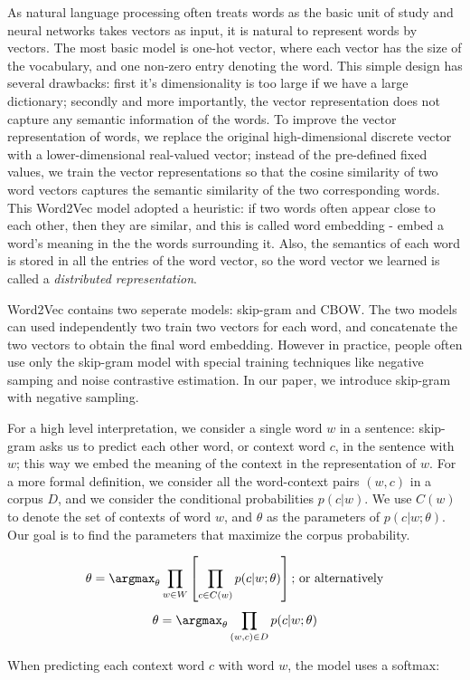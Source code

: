 As natural language processing often treats words as the basic unit of study and neural networks takes vectors as input, it is natural to represent words by vectors. The most basic model is one-hot vector, where each vector has the size of the vocabulary, and one non-zero entry denoting the word. This simple design has several drawbacks: first it's dimensionality is too large if we have a large dictionary; secondly and more importantly, the vector representation does not capture any semantic information of the words. To improve the vector representation of words, we replace the original high-dimensional discrete vector with a lower-dimensional real-valued vector; instead of the pre-defined fixed values, we train the vector representations so that the cosine similarity of two word vectors captures the semantic similarity of the two corresponding words. This Word2Vec \cite{mikolov2013distributed} model adopted a heuristic: if two words often appear close to each other, then they are similar, and this is called word embedding - embed a word's meaning in the the words surrounding it. Also, the semantics of each word is stored in all the entries of the word vector, so the word vector we learned is called a \emph{distributed representation}.

Word2Vec contains two seperate models: skip-gram and CBOW. The two models can used independently two train two vectors for each word, and concatenate the two vectors to obtain the final word embedding. However in practice, people often use only the skip-gram model with special training techniques like negative samping and noise contrastive estimation. In our paper, we introduce skip-gram with negative sampling.

For a high level interpretation, we consider a single word $w$ in a sentence: skip-gram asks us to predict each other word, or context word $c$, in the sentence with $w$; this way we embed the meaning of the context in the representation of $w$. For a more formal definition, we consider all the word-context pairs $(w,c)$ in a corpus $D$, and we consider the conditional probabilities $p(c|w)$. We use $C(w)$ to denote the set of contexts of word $w$, and $\theta$ as the parameters of $p(c|w; \theta)$. Our goal is to find the parameters that maximize the corpus probability.

$$\theta = \argmax_{\theta} \prod_{w\in W} \left[\prod_{c\in C(w)} p(c|w; \theta) \right]\text{;  or alternatively}$$
$$\theta = \argmax_{\theta} \prod_{(w,c)\in D} p(c|w; \theta)$$

When predicting each context word $c$ with word $w$, the model uses a softmax:

